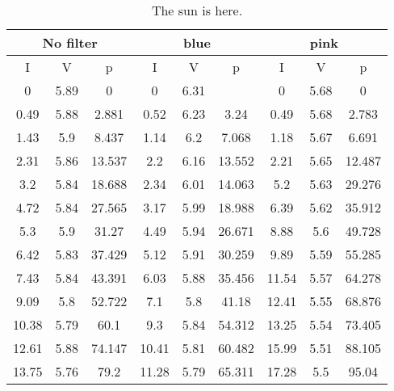 \begin{table*}[]
\caption{The sun is here.}
\label{tabsun}
\begin{tabular}{|c|c|c|c|c|c|c|c|c|}
\hline
\multicolumn{3}{|c|}{No filter}         & \multicolumn{3}{c|}{blue}              & \multicolumn{3}{c|}{pink}   \\ \hline
I            & V          & p           & I           & V          & p           & I       & V       & p       \\ \hline
0            & 5.89       & 0           & 0           & 6.31       &             & 0       & 5.68    & 0       \\ \hline
0.49         & 5.88       & 2.881       & 0.52        & 6.23       & 3.24        & 0.49    & 5.68    & 2.783   \\ \hline
1.43         & 5.9        & 8.437       & 1.14        & 6.2        & 7.068       & 1.18    & 5.67    & 6.691   \\ \hline
2.31         & 5.86       & 13.537      & 2.2         & 6.16       & 13.552      & 2.21    & 5.65    & 12.487  \\ \hline
3.2          & 5.84       & 18.688      & 2.34        & 6.01       & 14.063      & 5.2     & 5.63    & 29.276  \\ \hline
4.72         & 5.84       & 27.565      & 3.17        & 5.99       & 18.988      & 6.39    & 5.62    & 35.912  \\ \hline
5.3          & 5.9        & 31.27       & 4.49        & 5.94       & 26.671      & 8.88    & 5.6     & 49.728  \\ \hline
6.42         & 5.83       & 37.429      & 5.12        & 5.91       & 30.259      & 9.89    & 5.59    & 55.285  \\ \hline
7.43         & 5.84       & 43.391      & 6.03        & 5.88       & 35.456      & 11.54   & 5.57    & 64.278  \\ \hline
9.09         & 5.8        & 52.722      & 7.1         & 5.8        & 41.18       & 12.41   & 5.55    & 68.876  \\ \hline
10.38        & 5.79       & 60.1        & 9.3         & 5.84       & 54.312      & 13.25   & 5.54    & 73.405  \\ \hline
12.61        & 5.88       & 74.147      & 10.41       & 5.81       & 60.482      & 15.99   & 5.51    & 88.105  \\ \hline
13.75        & 5.76       & 79.2        & 11.28       & 5.79       & 65.311      & 17.28   & 5.5     & 95.04   \\ \hline

\end{tabular}
\end{table*}
